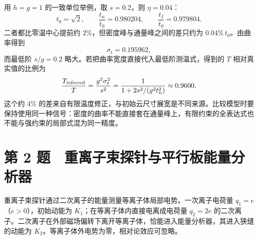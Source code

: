 \documentclass[12pt,a4paper,fontset=fandol]{ctexart}
\begin{document}
用 \(h=g=1\) 的一致单位举例，取 \(s=0.2\)，则 \(\eta=0.04\)： \[
t_0=\sqrt2,\qquad
\frac{t_n}{t_0}=0.980204,\qquad
\frac{t_I}{t_0}=0.979804.
\] 二者都比零温中心提前约 \(2\%\)，但密度峰与通量峰之间的差只约为
\(0.04\%\,t_0\)。由曲率得到 \[
\sigma_t=0.195962,
\] 而最低阶 \(s/g=0.2\) 略大。若把曲率宽度直接代入最低阶测温式，得到的
\(T\) 相对真实值的比例为 \[
\frac{T_{\rm inferred}}T
=\frac{g^2\sigma_t^2}{s^2}
=\frac1{1+2s^2/(g^2t_n^2)}
\approx0.9600.
\] 这个约 \(4\%\)
的差来自有限温度修正，与初始云尺寸展宽是不同来源。比较模型时要保持使用同一种信号：密度的曲率不能直接套在通量峰上，有限约束的全表达式也不能与强约束的局部式混为同一精度。

\clearpage

\section{第 2
题　重离子束探针与平行板能量分析器}\label{ux7b2c-2-ux9898-ux91cdux79bbux5b50ux675fux63a2ux9488ux4e0eux5e73ux884cux677fux80fdux91cfux5206ux6790ux5668}

重离子束探针通过二次离子的能量测量等离子体局部电势。一次离子电荷量
\(q_1=e\)（\(e>0\)），初始动能为 \(K_1\)；在等离子体内直接电离成电荷量
\(q_2=2e\)
的二次离子。二次离子在外部磁场偏转下离开等离子体，恰能进入能量分析器，其进入狭缝的动能为
\(K_2\)。等离子体外电势为零，相对论效应可忽略。

\begin{center}
\begin{minipage}{\linewidth}
\centering\begingroup
{}
\ifdim\wd\diagrambox>.88\linewidth
\sbox{\diagrambox}{\resizebox{.88\linewidth}{!}{\usebox{\diagrambox}}}
\fi
\ifdim\ht\diagrambox>.40\textheight
\resizebox{!}{.40\textheight}{\usebox{\diagrambox}}
\else\usebox{\diagrambox}\fi
\par{}
\endgroup\end{minipage}
\end{center}
\end{document}

